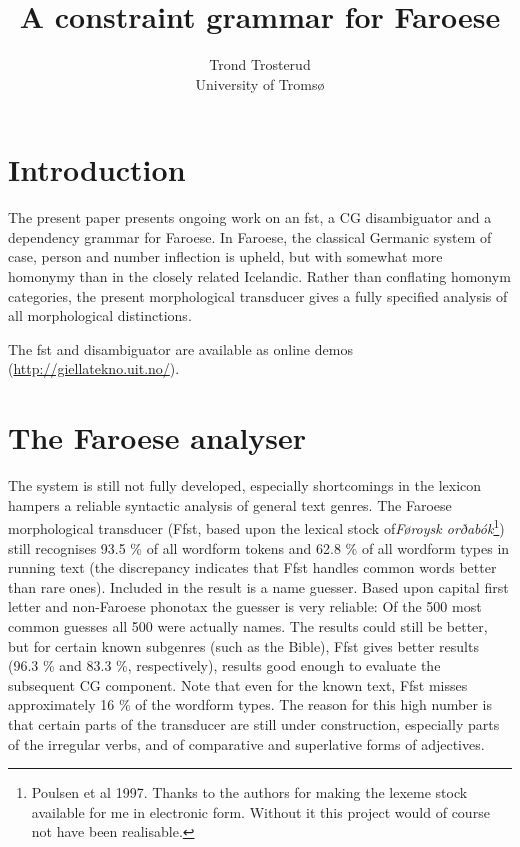 \documentclass[a4paper,english]{article}
\begin{document}
\title{A constraint grammar for Faroese}

\author{Trond Trosterud \\ 
University of Tromsø}

\maketitle


\section{Introduction} 

The present paper presents ongoing work on an fst, a CG disambiguator and a dependency grammar for Faroese. In Faroese, the classical Germanic system of case, person and number inflection is upheld, but with somewhat more homonymy than in the closely related Icelandic. Rather than conflating homonym categories, the present morphological transducer gives a fully specified analysis of all morphological distinctions. 

The fst and disambiguator are available as online demos (\url{http://giellatekno.uit.no/}).

\section{The Faroese analyser}

The system is still not fully developed, especially shortcomings in the lexicon hampers a reliable syntactic analysis of general text genres. The Faroese morphological transducer (Ffst, based upon the lexical stock of\textit{Føroysk orðabók}\footnote{Poulsen et al 1997. Thanks to the authors for making the lexeme stock available for me in electronic form. Without it this project would of course not have been realisable.}) still recognises 93.5 \% of all wordform tokens and 62.8 \% of all wordform types in running text (the discrepancy indicates that Ffst handles common words better than rare ones). Included in the result is a name guesser. Based upon capital first letter and non-Faroese phonotax the guesser is very reliable: Of the 500 most common guesses all 500 were actually names. The results could still be better, but for certain known subgenres (such as the Bible), Ffst gives better results (96.3 \% and 83.3 \%, respectively), results good enough to evaluate the subsequent CG component. Note that even for the known text, Ffst misses approximately 16 \% of the wordform types. The reason for this high number is that certain parts of the transducer are still under construction, especially parts of the irregular verbs, and of comparative and superlative forms of adjectives.
\end{document}
